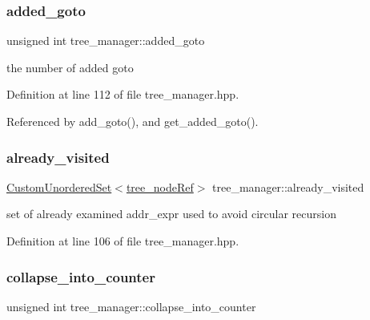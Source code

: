 \subsubsection{\texorpdfstring{added\+\_\+goto}{added\_goto}}
{\footnotesize\ttfamily unsigned int tree\+\_\+manager\+::added\+\_\+goto\hspace{0.3cm}{\ttfamily [private]}}



the number of added goto 



Definition at line 112 of file tree\+\_\+manager.\+hpp.



Referenced by add\+\_\+goto(), and get\+\_\+added\+\_\+goto().

\mbox{\label{classtree__manager_a9be32a1a1bed7bf705250f21b9539597}} 
\subsubsection{\texorpdfstring{already\+\_\+visited}{already\_visited}}
{\footnotesize\ttfamily \hyperlink{classCustomUnorderedSet}{Custom\+Unordered\+Set}$<$\hyperlink{tree__node_8hpp_a6ee377554d1c4871ad66a337eaa67fd5}{tree\+\_\+node\+Ref}$>$ tree\+\_\+manager\+::already\+\_\+visited\hspace{0.3cm}{\ttfamily [private]}}



set of already examined addr\+\_\+expr used to avoid circular recursion 



Definition at line 106 of file tree\+\_\+manager.\+hpp.

\mbox{\label{classtree__manager_a1c07ed7614093eadef6f97dae7197035}} 
\subsubsection{\texorpdfstring{collapse\+\_\+into\+\_\+counter}{collapse\_into\_counter}}
{\footnotesize\ttfamily unsigned int tree\+\_\+manager\+::collapse\+\_\+into\+\_\+counter\hspace{0.3cm}{\ttfamily [private]}}



